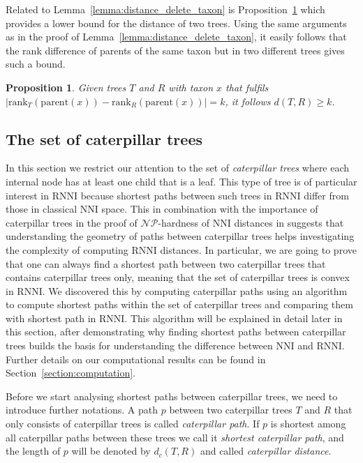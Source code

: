 \documentclass{amsart}
\newcommand{\np}{\mathcal{NP}}
\newcommand{\parent}{\mathrm{parent}}
\newcommand{\rank}{\mathrm{rank}}
\newcommand{\nni}{\mathrm{NNI}}
\newcommand{\rnni}{\mathrm{RNNI}}
\newtheorem{proposition}[definition]{Proposition}
\begin{document}
Related to Lemma~\ref{lemma:distance_delete_taxon} is Proposition~\ref{proposition:lower_bound_distance} which provides a lower bound for the distance of two trees.
Using the same arguments as in the proof of Lemma~\ref{lemma:distance_delete_taxon}, it easily follows that the rank difference of parents of the same taxon but in two different trees gives such a bound.

\begin{proposition}
    Given trees $T$ and $R$ with taxon $x$ that fulfils $|\rank_T(\parent(x)) - \rank_R(\parent(x))| = k$, it follows $d(T,R) \geq k$.
    \label{proposition:lower_bound_distance}
\end{proposition}

\subsection{The set of caterpillar trees}
\label{section:caterpillar_convex}

In this section we restrict our attention to the set of \emph{caterpillar trees} where each internal node has at least one child that is a leaf.
This type of tree is of particular interest in $\rnni$ because shortest paths between such trees in $\rnni$ differ from those in classical $\nni$ space.
This in combination with the importance of caterpillar trees in the proof of $\np$-hardness of $\nni$ distances in \autocite{Dasgupta2000-xa} suggests that understanding the geometry of paths between caterpillar trees helps investigating the complexity of computing $\rnni$ distances.
In particular, we are going to prove that one can always find a shortest path between two caterpillar trees that contains caterpillar trees only, meaning that the set of caterpillar trees is convex in $\rnni$.
We discovered this by computing caterpillar paths using an algorithm to compute shortest paths within the set of caterpillar trees and comparing them with shortest path in $\rnni$.
This algorithm will be explained in detail later in this section, after demonstrating why finding shortest paths between caterpillar trees builds the basis for understanding the difference between $\nni$ and $\rnni$.
Further details on our computational results can be found in Section~\ref{section:computation}.

Before we start analysing shortest paths between caterpillar trees, we need to introduce further notations.
A path $p$ between two caterpillar trees $T$ and $R$ that only consists of caterpillar trees is called \emph{caterpillar path}.
If $p$ is shortest among all caterpillar paths between these trees we call it \emph{shortest caterpillar path}, and the length of $p$ will be denoted by $d_c(T,R)$ and called \emph{caterpillar distance}.
\end{document}
